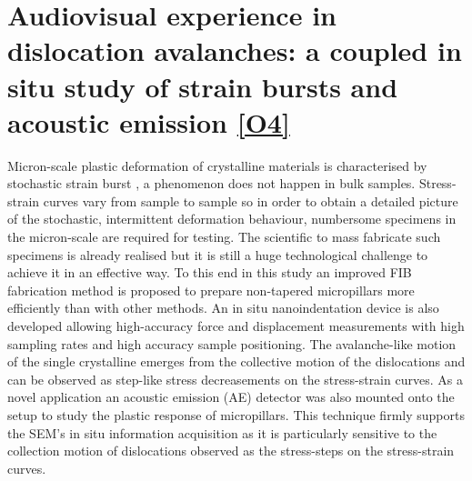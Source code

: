 \chapter[In-situ study of avalanches]{Audiovisual experience in dislocation avalanches: a coupled in situ study of strain bursts and acoustic emission \hyperref[paper:A1]{[O4]}} \label{chapter:in_situ}

\ifpdf
    \graphicspath{{Chapter3/Figs/Raster/}{Chapter3/Figs/PDF/}{Chapter3/Figs/}}
\else
    \graphicspath{{Chapter3/Figs/Vector/}{Chapter3/Figs/}}
\fi

Micron-scale plastic deformation of crystalline materials is characterised by stochastic strain burst \cite{PhysRevLett.89.165501,weiss2003three,PhysRevLett.93.195507,1742-5468-2005-08-P08004,Zapperi2012}, a phenomenon does not happen in bulk samples. Stress-strain curves vary from sample to sample so in order to obtain a detailed picture of the stochastic, intermittent deformation behaviour, numbersome specimens in the micron-scale are required for testing. The scientific to mass fabricate such specimens is already realised but it is still a huge technological challenge to achieve it in an effective way. To this end in this study an improved FIB fabrication method is proposed to prepare non-tapered micropillars more efficiently than with other methods. An in situ nanoindentation device is also developed allowing high-accuracy force and displacement measurements with high sampling rates and high accuracy sample positioning. The avalanche-like motion of the single crystalline emerges from the collective motion of the dislocations and can be observed as step-like stress decreasements on the stress-strain curves. As a novel application an acoustic emission (AE)  detector was also mounted onto the setup to study the plastic response of micropillars. This technique firmly supports the SEM's in situ information acquisition as it is particularly sensitive to the collection motion of dislocations observed as the stress-steps on the stress-strain curves.

